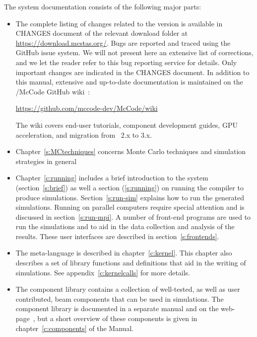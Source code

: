 The \MCS system documentation consists of the following major
parts:
\begin{itemize}
\item The complete listing of changes related to the version \MCS \version
is available in CHANGES document of the relevant download folder at
\url{https://download.mcstas.org/}. Bugs are reported and traced using
the \MCS GitHub issue system\cite{github_issue_webpage}. We will not
present here an extensive list of corrections, and we let the reader
refer to this bug reporting service for details. Only important
changes are indicated in the CHANGES document.
In addition to this manual, extensive and up-to-date documentation is
maintained on the \MCS/McCode GitHub wiki~\cite{Wiki}:
\begin{center}
  \url{https://github.com/mccode-dev/McCode/wiki}
\end{center}
The wiki covers end-user tutorials, component development guides, GPU
acceleration, and migration from \MCS~2.x to 3.x.
\item Chapter~\ref{s:MCtechniques} concerns Monte Carlo techniques
  and simulation strategies in general
\item Chapter~\ref{c:running} includes a brief introduction to the
  \MCS system
  (section~\ref{s:brief}) as well a section (\ref{s:running}) on running the compiler to produce
  simulations. Section~\ref{s:run-sim} explains how to run the generated
  simulations. Running \MCS on parallel computers require special
  attention and is discussed in section~\ref{s:run-mpi}. A number of front-end programs are used to run the
  simulations and to aid in the data collection and analysis of the
  results. These user interfaces are described in section~\ref{s:frontends}.
\item The \MCS meta-language is described in chapter~\ref{c:kernel}. This
  chapter also describes a set of library functions and definitions
  that aid in the writing of simulations. See
  appendix~\ref{c:kernelcalls} for more details.
\item The \MCS component library contains a collection of
  well-tested, as well as user contributed, beam components that can be used in simulations.
  The \MCS component library is documented in a separate manual
  and on the \MCS web-page~\cite{mcstas_webpage}, but a short overview of these
  components is given in chapter~\ref{c:components} of the Manual.

\end{itemize}

